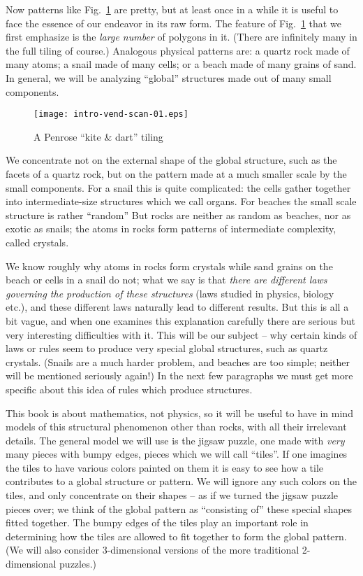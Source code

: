 \documentclass[reqno]{stml-l}
\theoremstyle{plain}
\theoremstyle{definition}
\numberwithin{equation}{chapter}
\begin{document}
Now patterns like Fig.~\ref{Intro:fig1} are pretty, but at least once in a while it is useful to face the essence of our endeavor in its raw form. The feature of Fig.~\ref{Intro:fig1} that we first emphasize is the \emph{large number} of polygons in it. (There are infinitely many in the full tiling of course.) Analogous physical patterns are: a quartz rock made of many atoms; a snail made of many cells; or a beach made of many grains of sand. In general, we will be analyzing ``global'' structures made out of many small components.

\begin{figure}[!h]
\texttt{[image: intro-vend-scan-01.eps]}
\caption{A Penrose ``kite \& dart'' tiling}\label{Intro:fig1}
\end{figure}


We concentrate not on the external shape of the global structure, such as the facets of a quartz rock, but on the pattern made at a much smaller scale by the small components. For a snail this is quite complicated: the cells gather together into intermediate-size structures which we call organs. For beaches the small scale structure is rather ``random'' But rocks are neither as random as beaches, nor as exotic as snails; the atoms in rocks form patterns of intermediate complexity, called crystals.

We know roughly why atoms in rocks form crystals while sand grains on the beach or cells in a snail do not; what we say is that \emph{there are different laws governing the production of these structures} (laws studied in physics, biology etc.), and these different laws naturally lead to different results. But this is all a bit vague, and when one examines this explanation carefully there are serious but very interesting difficulties with it. This will be our subject -- why certain kinds of laws or rules seem to produce very special global structures, such as quartz crystals. (Snails are a much harder problem, and beaches are too simple; neither will be mentioned seriously again!) In the next few paragraphs we must get more specific about this idea of rules which produce structures.

This book is about mathematics, not physics, so it will be useful to have in mind models of this structural phenomenon other than rocks, with all their irrelevant details. The general model we will use is the jigsaw puzzle, one made with \emph{very} many pieces with bumpy edges, pieces which we will call ``tiles''. If one imagines the tiles to have various colors painted on them it is easy to see how a tile contributes to a global structure or pattern. We will ignore any such colors on the tiles, and only concentrate on their shapes -- as if we turned the jigsaw puzzle pieces over; we think of the global pattern as ``consisting of'' these special shapes fitted together. The bumpy edges of the tiles play an important role in determining how the tiles are allowed to fit together to form the global pattern. (We will also consider 3-dimensional versions of the more traditional 2-dimensional puzzles.)
\end{document}
